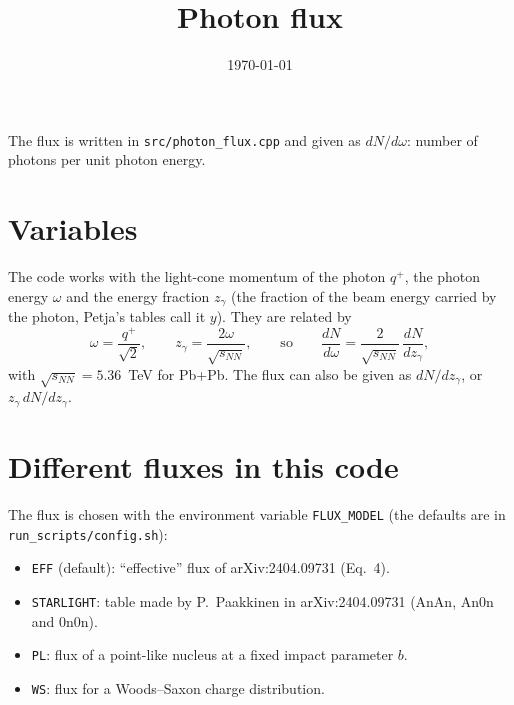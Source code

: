 \documentclass{article}
\title{Photon flux}
\author{}
\date{\today}
\begin{document}
\begingroup\let\newpage\relax   
\makeatletter\renewcommand\@maketitle{\begin{center}{\LARGE\@title\par}\vskip 0.5em{\large\@date\par}\end{center}\vskip 0.5em}\makeatother
\maketitle
\endgroup


The flux is written in 
\texttt{src/photon\_flux.cpp} and given as $dN/d\omega$: number of photons
per unit photon energy.


\section{Variables}

The code works with the light-cone momentum of the photon $q^+$, the photon energy $\omega$ and the energy fraction $z_\gamma$ (the fraction
of the beam energy carried by the photon, Petja's tables call it $y$).
They are related by
\begin{equation}
  \omega = \frac{q^+}{\sqrt2}, \qquad
  z_\gamma = \frac{2\omega}{\sqrt{s_{NN}}}, \qquad\text{so}\qquad
  \frac{dN}{d\omega} = \frac{2}{\sqrt{s_{NN}}}\,\frac{dN}{dz_\gamma},
\end{equation}
with $\sqrt{s_{NN}} = 5.36$~TeV for Pb+Pb. The flux can also be given as $dN/dz_\gamma$, or $z_\gamma\,dN/dz_\gamma$.

\section{Different fluxes in this code}

The flux is chosen with the environment variable \texttt{FLUX\_MODEL}
(the defaults are in \texttt{run\_scripts/config.sh}):

\begin{itemize}
\item \texttt{EFF} (default): ``effective'' flux of arXiv:2404.09731 (Eq.~4).
\item \texttt{STARLIGHT}: table made by P.~Paakkinen in arXiv:2404.09731 (AnAn, An0n and 0n0n).
\item \texttt{PL}: flux of a point-like nucleus at a fixed impact parameter $b$.
\item \texttt{WS}: flux for a Woods--Saxon charge distribution.
\end{itemize}
\end{document}
